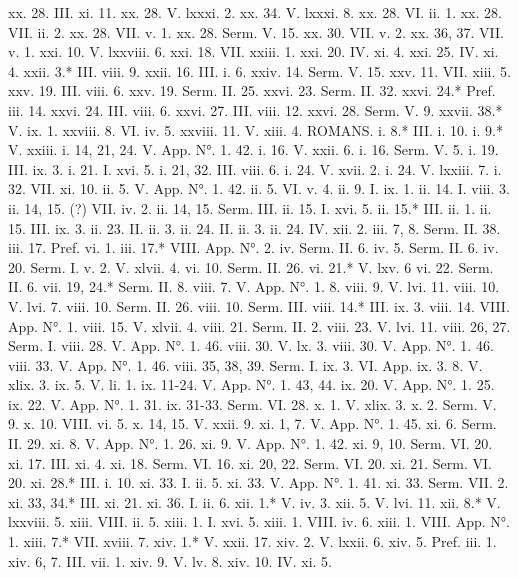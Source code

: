 xx. 28.	III. xi. 11.
xx. 28.	V. lxxxi. 2.
xx. 34.	V. lxxxi. 8.
xx. 28.	VI. ii. 1.
xx. 28.	VII. ii. 2.
xx. 28.	VII. v. 1.
xx. 28.	Serm. V. 15.
xx. 30.	VII. v. 2.
xx. 36, 37.	VII. v. 1.
xxi. 10.	V. lxxviii. 6.
xxi. 18.	VII. xxiii. 1.
xxi. 20.	IV. xi. 4.
xxi. 25.	IV. xi. 4.
xxii. 3.*	III. viii. 9.
xxii. 16.	III. i. 6.
xxiv. 14.	Serm. V. 15.
xxv. 11.	VII. xiii. 5.
xxv. 19.	III. viii. 6.
xxv. 19.	Serm. II. 25.
xxvi. 23.	Serm. II. 32.
xxvi. 24.*	Pref. iii. 14.
xxvi. 24.	III. viii. 6.
xxvi. 27.	III. viii. 12.
xxvi. 28.	Serm. V. 9.
xxvii. 38.*	V. ix. 1.
xxviii. 8.	VI. iv. 5.
xxviii. 11.	V. xiii. 4.
ROMANS.
i. 8.*	III. i. 10.
i. 9.*	V. xxiii.
i. 14, 21, 24.	V. App. N°. 1. 42.
i. 16.	V. xxii. 6.
i. 16.	Serm. V. 5.
i. 19.	III. ix. 3.
i. 21.	I. xvi. 5.
i. 21, 32.	III. viii. 6.
i. 24.	V. xvii. 2.
i. 24.	V. lxxiii. 7.
i. 32.	VII. xi. 10.
ii. 5.	V. App. N°. 1. 42.
ii. 5.	VI. v. 4.
ii. 9.	I. ix. 1.
ii. 14.	I. viii. 3.
ii. 14, 15. (?)	VII. iv. 2.
ii. 14, 15.	Serm. III.
ii. 15.	I. xvi. 5.
ii. 15.*	III. ii. 1.
ii. 15.	III. ix. 3.
ii. 23.	II. ii. 3.
ii. 24.	II. ii. 3.
ii. 24.	IV. xii. 2.
iii. 7, 8.	Serm. II. 38.
iii. 17.	Pref. vi. 1.
iii. 17.*	VIII. App. N°. 2.
iv.	Serm. II. 6.
iv. 5.	Serm. II. 6.
iv. 20.	Serm. I.
v. 2.	V. xlvii. 4.
vi. 10.	Serm. II. 26.
vi. 21.*	V. lxv. 6
vi. 22.	Serm. II. 6.
vii. 19, 24.*	Serm. II. 8.
viii. 7.	V. App. N°. 1. 8.
viii. 9.	V. lvi. 11.
viii. 10.	V. lvi. 7.
viii. 10.	Serm. II. 26.
viii. 10.	Serm. III.
viii. 14.*	III. ix. 3.
viii. 14.	VIII. App. N°. 1.
viii. 15.	V. xlvii. 4.
viii. 21.	Serm. II. 2.
viii. 23.	V. lvi. 11.
viii. 26, 27.	Serm. I.
viii. 28.	V. App. N°. 1. 46.
viii. 30.	V. lx. 3.
viii. 30.	V. App. N°. 1. 46.
viii. 33.	V. App. N°. 1. 46.
viii. 35, 38, 39.	Serm. I.
ix. 3.	VI. App.
ix. 3. 8.	V. xlix. 3.
ix. 5.	V. li. 1.
ix. 11-24.	V. App. N°. 1. 43, 44.
ix. 20.	V. App. N°. 1. 25.
ix. 22.	V. App. N°. 1. 31.
ix. 31-33.	Serm. VI. 28.
x. 1.	V. xlix. 3.
x. 2.	Serm. V. 9.
x. 10.	VIII. vi. 5.
x. 14, 15.	V. xxii. 9.
xi. 1, 7.	V. App. N°. 1. 45.
xi. 6.	Serm. II. 29.
xi. 8.	V. App. N°. 1. 26.
xi. 9.	V. App. N°. 1. 42.
xi. 9, 10.	Serm. VI. 20.
xi. 17.	III. xi. 4.
xi. 18.	Serm. VI. 16.
xi. 20, 22.	Serm. VI. 20.
xi. 21.	Serm. VI. 20.
xi. 28.*	III. i. 10.
xi. 33.	I. ii. 5.
xi. 33.	V. App. N°. 1. 41.
xi. 33.	Serm. VII. 2.
xi. 33, 34.*	III. xi. 21.
xi. 36.	I. ii. 6.
xii. 1.*	V. iv. 3.
xii. 5.	V. lvi. 11.
xii. 8.*	V. lxxviii. 5.
xiii.	VIII. ii. 5.
xiii. 1.	I. xvi. 5.
xiii. 1.	VIII. iv. 6.
xiii. 1.	VIII. App. N°. 1.
xiii. 7.*	VII. xviii. 7.
xiv. 1.*	V. xxii. 17.
xiv. 2.	V. lxxii. 6.
xiv. 5.	Pref. iii. 1.
xiv. 6, 7.	III. vii. 1.
xiv. 9.	V. lv. 8.
xiv. 10.	IV. xi. 5.

